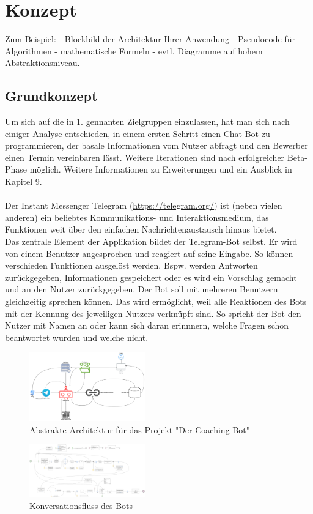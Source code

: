 \chapter{Konzept}

Zum Beispiel:  
- Blockbild der Architektur Ihrer Anwendung  
- Pseudocode für Algorithmen  
- mathematische Formeln  
- evtl. Diagramme auf hohem Abstraktionsniveau.  

\section{Grundkonzept}

	Um sich auf die in 1. gennanten Zielgruppen einzulassen, hat man sich nach einiger Analyse entschieden, in einem ersten Schritt einen Chat-Bot zu programmieren, der basale Informationen vom Nutzer abfragt und den Bewerber einen Termin vereinbaren lässt. Weitere Iterationen sind nach erfolgreicher Beta-Phase möglich. Weitere Informationen zu Erweiterungen und ein Ausblick in Kapitel 9.\\
	\\
	Der Instant Messenger Telegram (\url{https://telegram.org/}) ist (neben vielen anderen) ein beliebtes Kommunikations- und Interaktionsmedium, das Funktionen weit über den einfachen Nachrichtenaustausch hinaus bietet.\\

 	Das zentrale Element der Applikation bildet der Telegram-Bot selbst. Er wird von einem Benutzer angesprochen und reagiert auf seine Eingabe. So können verschieden Funktionen ausgelöst werden. Bspw. werden Antworten zurückgegeben, Informationen gespeichert oder es wird ein Vorschlag gemacht und an den Nutzer zurückgegeben. Der Bot soll mit mehreren Benutzern gleichzeitig sprechen können. Das wird ermöglicht, weil alle Reaktionen des Bots mit der Kennung des jeweiligen Nutzers verknüpft sind. So spricht der Bot den Nutzer mit Namen an oder kann sich daran erinnnern, welche Fragen schon beantwortet wurden und welche nicht.	 


 \begin{figure} %
	\centering
	\includegraphics[width=50mm,scale=0.5]{images/220213_PA28464_Architecture.png}
	\caption{Abstrakte Architektur für das Projekt "Der Coaching Bot"}
	\label{architecture}
\end{figure}


\begin{figure} %
	\centering
	\includegraphics[width=50mm,scale=0.5]{images/220213_PA28464_Conversation_Flow.png}
	\caption{Konversationsfluss des Bots}
	\label{conversationFlow}
\end{figure}

